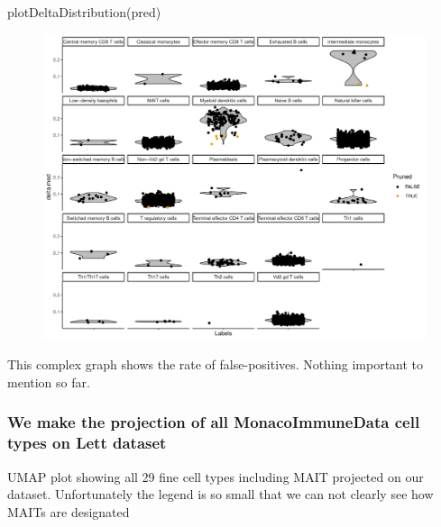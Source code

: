 \documentclass[
  letterpaper,
  DIV=11,
  numbers=noendperiod]{scrartcl}
\newenvironment{Shaded}{\begin{snugshade}}{\end{snugshade}}
\newcommand{\AttributeTok}[1]{\textcolor[rgb]{0.40,0.45,0.13}{#1}}
\newcommand{\FloatTok}[1]{\textcolor[rgb]{0.68,0.00,0.00}{#1}}
\newcommand{\FunctionTok}[1]{\textcolor[rgb]{0.28,0.35,0.67}{#1}}
\newcommand{\NormalTok}[1]{\textcolor[rgb]{0.00,0.23,0.31}{#1}}
\newcommand{\OtherTok}[1]{\textcolor[rgb]{0.00,0.23,0.31}{#1}}
\newcommand{\SpecialCharTok}[1]{\textcolor[rgb]{0.37,0.37,0.37}{#1}}
\newcommand{\StringTok}[1]{\textcolor[rgb]{0.13,0.47,0.30}{#1}}
\begin{document}
\begin{Shaded}
\begin{Highlighting}[]
\FunctionTok{plotDeltaDistribution}\NormalTok{(pred)}
\end{Highlighting}
\end{Shaded}

\begin{figure}[H]

{\centering \includegraphics{2-Lett-data-SingleR_pdf_files/figure-pdf/unnamed-chunk-7-1.pdf}

}

\end{figure}

This complex graph shows the rate of false-positives. Nothing important
to mention so far.

\hypertarget{we-make-the-projection-of-all-monacoimmunedata-cell-types-on-lett-dataset}{%
\subsubsection{We make the projection of all MonacoImmuneData cell types
on Lett
dataset}\label{we-make-the-projection-of-all-monacoimmunedata-cell-types-on-lett-dataset}}

UMAP plot showing all 29 fine cell types including MAIT projected on our
dataset. Unfortunately the legend is so small that we can not clearly
see how MAITs are designated

\begin{Shaded}
\end{Shaded}
\end{document}
